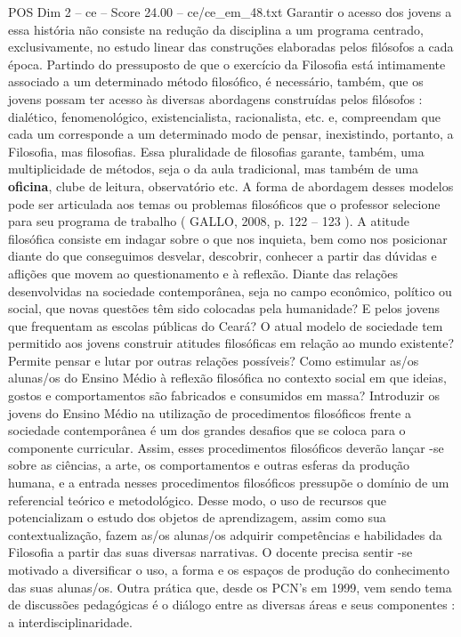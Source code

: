 \begin{textsample}{POS Dim 2 – ce – Score 24.00 – ce/ce\_em\_48.txt}
Garantir o acesso dos jovens a essa história não consiste na redução da disciplina a um programa centrado, exclusivamente, no estudo linear das construções elaboradas pelos filósofos a cada época.
Partindo do pressuposto de que o exercício da Filosofia está intimamente associado a um determinado método filosófico, é necessário, também, que os jovens possam ter acesso às diversas abordagens construídas pelos filósofos : dialético, fenomenológico, existencialista, racionalista, etc. e, compreendam que cada um corresponde a um determinado modo de pensar, inexistindo, portanto, a Filosofia, mas filosofias.
Essa pluralidade de filosofias garante, também, uma multiplicidade de métodos, seja o da aula tradicional, mas também de uma \textbf{oficina}, clube de leitura, observatório etc.
A forma de abordagem desses modelos pode ser articulada aos temas ou problemas filosóficos que o professor selecione para seu programa de trabalho ( GALLO, 2008, p. 122 – 123 ).
A atitude filosófica consiste em indagar sobre o que nos inquieta, bem como nos posicionar diante do que conseguimos desvelar, descobrir, conhecer a partir das dúvidas e aflições que movem ao questionamento e à reflexão.
Diante das relações desenvolvidas na sociedade contemporânea, seja no campo econômico, político ou social, que novas questões têm sido colocadas pela humanidade?
E pelos jovens que frequentam as escolas públicas do Ceará?
O atual modelo de sociedade tem permitido aos jovens construir atitudes filosóficas em relação ao mundo existente?
Permite pensar e lutar por outras relações possíveis?
Como estimular as/os alunas/os do Ensino Médio à reflexão filosófica no contexto social em que ideias, gostos e comportamentos são fabricados e consumidos em massa?
Introduzir os jovens do Ensino Médio na utilização de procedimentos filosóficos frente a sociedade contemporânea é um dos grandes desafios que se coloca para o componente curricular.
Assim, esses procedimentos filosóficos deverão lançar -se sobre as ciências, a arte, os comportamentos e outras esferas da produção humana, e a entrada nesses procedimentos filosóficos pressupõe o domínio de um referencial teórico e metodológico.
Desse modo, o uso de recursos que potencializam o estudo dos objetos de aprendizagem, assim como sua contextualização, fazem as/os alunas/os adquirir competências e habilidades da Filosofia a partir das suas diversas narrativas.
O docente precisa sentir -se motivado a diversificar o uso, a forma e os espaços de produção do conhecimento das suas alunas/os.
Outra prática que, desde os PCN’s em 1999, vem sendo tema de discussões pedagógicas é o diálogo entre as diversas áreas e seus componentes : a interdisciplinaridade.

\end{textsample}
